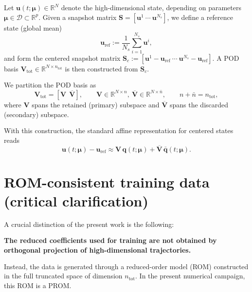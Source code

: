 \documentclass[11pt]{article}
\begin{document}
Let $\mathbf u(t;\bm\mu)\in\mathbb R^{N}$ denote the high-dimensional state, depending on parameters $\bm\mu\in\mathcal D\subset\mathbb R^{p}$.
Given a snapshot matrix $\mathbf S=[\mathbf u^{1}\ \cdots\ \mathbf u^{N_s}]$, we define a reference state (global mean)
\begin{equation}
\mathbf u_{\mathrm{ref}} := \frac{1}{N_s}\sum_{i=1}^{N_s}\mathbf u^{i},
\end{equation}
and form the centered snapshot matrix $\mathbf S_c := [\mathbf u^{1}-\mathbf u_{\mathrm{ref}}\ \cdots\ \mathbf u^{N_s}-\mathbf u_{\mathrm{ref}}]$.
A POD basis $\mathbf V_{\mathrm{tot}}\in\mathbb R^{N\times n_{\mathrm{tot}}}$ is then constructed from $\mathbf S_c$.

We partition the POD basis as
\begin{equation}
\mathbf V_{\mathrm{tot}} = [\mathbf V \ \ \overline{\mathbf V}],
\qquad
\mathbf V\in\mathbb R^{N\times n},\ 
\overline{\mathbf V}\in\mathbb R^{N\times \bar n},
\qquad n+\bar n=n_{\mathrm{tot}},
\end{equation}
where $\mathbf{V}$ spans the retained (primary) subspace and $\overline{\mathbf{V}}$ spans the discarded (secondary) subspace.

With this construction, the standard affine representation for centered states reads
\begin{equation}
\mathbf u(t;\bm\mu)-\mathbf u_{\mathrm{ref}}
\approx
\mathbf V\,\mathbf q(t;\bm\mu)+\overline{\mathbf V}\,\bar{\mathbf q}(t;\bm\mu).
\end{equation}

\section{ROM-consistent training data (critical clarification)}

A crucial distinction of the present work is the following:

\medskip
\noindent
\textbf{The reduced coefficients used for training are not obtained by orthogonal projection of high-dimensional trajectories.}
\medskip

Instead, the data is generated through a reduced-order model (ROM) constructed in the full truncated space of dimension $n_{\text{tot}}$. In the present numerical campaign, this ROM is a PROM.

\medskip
\end{document}
